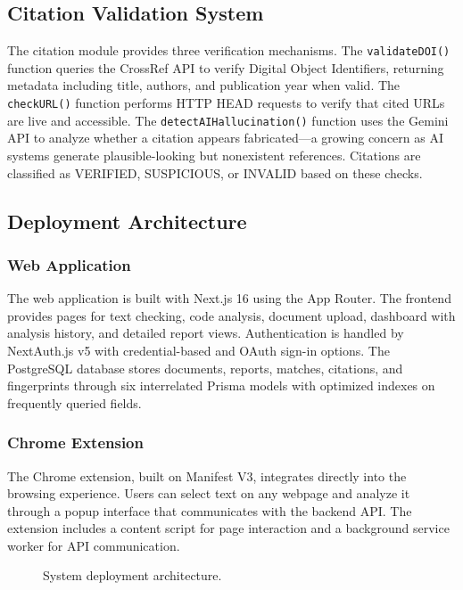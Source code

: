 \documentclass[10pt,twocolumn]{article}
\begin{document}
\subsection{Citation Validation System}

The citation module provides three verification mechanisms. The \texttt{validateDOI()} function queries the CrossRef API to verify Digital Object Identifiers, returning metadata including title, authors, and publication year when valid. The \texttt{checkURL()} function performs HTTP HEAD requests to verify that cited URLs are live and accessible. The \texttt{detectAIHallucination()} function uses the Gemini API to analyze whether a citation appears fabricated---a growing concern as AI systems generate plausible-looking but nonexistent references. Citations are classified as VERIFIED, SUSPICIOUS, or INVALID based on these checks.

\subsection{Deployment Architecture}

\subsubsection{Web Application}
The web application is built with Next.js 16 using the App Router. The frontend provides pages for text checking, code analysis, document upload, dashboard with analysis history, and detailed report views. Authentication is handled by NextAuth.js v5 with credential-based and OAuth sign-in options. The PostgreSQL database stores documents, reports, matches, citations, and fingerprints through six interrelated Prisma models with optimized indexes on frequently queried fields.

\subsubsection{Chrome Extension}
The Chrome extension, built on Manifest V3, integrates directly into the browsing experience. Users can select text on any webpage and analyze it through a popup interface that communicates with the backend API. The extension includes a content script for page interaction and a background service worker for API communication.

\begin{figure}[htbp]
\centering
\vspace{4cm}
\caption{System deployment architecture.}
\label{fig:deploy}
\end{figure}
\end{document}
